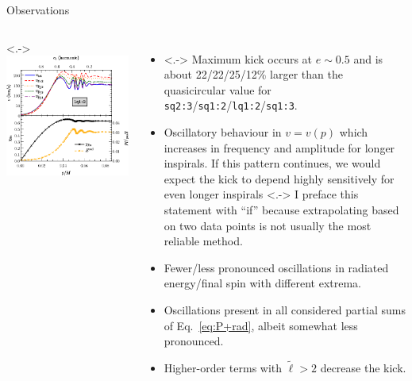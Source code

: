 \documentclass[smaller,aspectratio=169]{beamer}
\newcommand{\tl}{\tilde{\ell}}
\begin{document}
\begin{frame}{Observations}
	\begin{columns}
			\centering
			\only<.->{
				\includegraphics[width=\columnwidth]{kick-q2l-wlabel.eps}
			}
			\begin{itemize}
                \note[item]<.->{
                    This slide is just summarizing what I have already said.}
				\item<.-> 
					\alert{Maximum} kick occurs at $e\sim0.5$ and 
					is about 22/22/25/12\% larger than the 
					quasicircular value for 
					\texttt{sq2:3}/\texttt{sq1:2}/\texttt{lq1:2}/\texttt{sq1:3}.
				\item<+->
					\alert{Oscillatory} behaviour in $v=v(p)$ 
					which increases in 
					frequency and amplitude for longer inspirals. 
					If this pattern continues,
					we would expect the kick to depend 
					\alert{highly sensitively} for even longer inspirals
                \note[item]<.->{
                    I preface this statement with ``if'' because extrapolating
                    based on two data points is not usually the most reliable
                    method.}
				\item<+->
					Fewer/less pronounced oscillations in radiated 
					energy/final spin with different extrema.
				\item<+->
					Oscillations present in all considered partial 
					sums of Eq.~\eqref{eq:P+rad},
					albeit somewhat less pronounced.
				\item<+->
					Higher-order terms with $\tl>2$ \alert{decrease} the kick.
			\end{itemize}
	\end{columns}
\end{frame}
\end{document}
